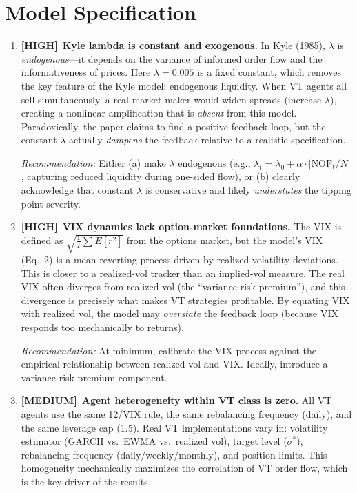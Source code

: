 \documentclass[12pt,a4paper]{article}
\newcommand{\HIGH}{\textbf{\textcolor{highred}{[HIGH]}}}
\newcommand{\MEDIUM}{\textbf{\textcolor{medorange}{[MEDIUM]}}}
\begin{document}
\section{Model Specification}
\label{sec:model}

\begin{enumerate}[leftmargin=2em,resume]

\item \HIGH\ \textbf{Kyle lambda is constant and exogenous.} In Kyle (1985), $\lambda$ is \emph{endogenous}---it depends on the variance of informed order flow and the informativeness of prices. Here $\lambda = 0.005$ is a fixed constant, which removes the key feature of the Kyle model: endogenous liquidity. When VT agents all sell simultaneously, a real market maker would widen spreads (increase $\lambda$), creating a nonlinear amplification that is \emph{absent} from this model. Paradoxically, the paper claims to find a positive feedback loop, but the constant $\lambda$ actually \emph{dampens} the feedback relative to a realistic specification.

\textit{Recommendation:} Either (a) make $\lambda$ endogenous (e.g., $\lambda_t = \lambda_0 + \alpha \cdot |\text{NOF}_t/N|$, capturing reduced liquidity during one-sided flow), or (b) clearly acknowledge that constant $\lambda$ is conservative and likely \emph{understates} the tipping point severity.

\item \HIGH\ \textbf{VIX dynamics lack option-market foundations.} The VIX is defined as $\sqrt{\frac{1}{T}\sum E[r^2]}$ from the options market, but the model's VIX (Eq.~2) is a mean-reverting process driven by realized volatility deviations. This is closer to a realized-vol tracker than an implied-vol measure. The real VIX often diverges from realized vol (the ``variance risk premium''), and this divergence is precisely what makes VT strategies profitable. By equating VIX with realized vol, the model may \emph{overstate} the feedback loop (because VIX responds too mechanically to returns).

\textit{Recommendation:} At minimum, calibrate the VIX process against the empirical relationship between realized vol and VIX. Ideally, introduce a variance risk premium component.

\item \MEDIUM\ \textbf{Agent heterogeneity within VT class is zero.} All VT agents use the same 12/VIX rule, the same rebalancing frequency (daily), and the same leverage cap (1.5). Real VT implementations vary in: volatility estimator (GARCH vs.\ EWMA vs.\ realized vol), target level ($\sigma^*$), rebalancing frequency (daily/weekly/monthly), and position limits. This homogeneity mechanically maximizes the correlation of VT order flow, which is the key driver of the results.


\end{enumerate}
\end{document}
